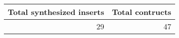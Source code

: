 \begin{table}
\centering
\caption{}
\label{table:3}
\begin{tabular}{rr}
\toprule
 Total synthesized inserts &  Total contructs \\
\midrule
                        29 &               47 \\
\bottomrule
\end{tabular}
\end{table}
